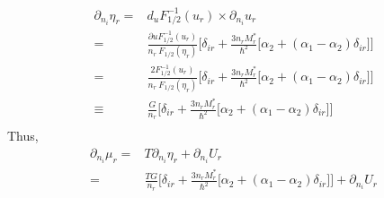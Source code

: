 \documentclass[preprint,prc,preprintnumbers,superscriptaddress,amsmath,amssymb,floatfix]{revtex4-1}
\begin{document}
\begin{equation}
 \begin{split}
  \partial_{n_i}\eta_r=&d_{u}F^{-1}_{1/2}(u_r) \times \partial_{n_i}u_r\\
  =&\frac{\partial{u}F^{-1}_{1/2}(u_r)}{n_r \ F_{1/2}(\eta_r)} \Big[\delta_{ir}+\frac{3 n_r M_r^{*}}{\hbar^2}\big[\alpha_2+(\alpha_1-\alpha_2)\delta_{ir}\big]\Big]\\
  =&\frac{2F^{-1}_{1/2}(u_r)}{n_r \ F_{1/2}(\eta_r)} \Big[\delta_{ir}+\frac{3 n_r M_r^{*}}{\hbar^2}\big[\alpha_2+(\alpha_1-\alpha_2)\delta_{ir}\big]\Big]\\
  \equiv& \frac{G}{n_r}\Big[\delta_{ir}+\frac{3 n_r M_r^{*}}{\hbar^2}\big[\alpha_2+(\alpha_1-\alpha_2)\delta_{ir}\big]\Big]\\
 \end{split}
\end{equation}
Thus,
\begin{equation}
 \begin{split}
  \partial_{n_i}\mu_r =& T\partial_{n_i}\eta_r + \partial_{n_i} U_r\\
  =&\frac{TG}{n_r}\Big[\delta_{ir}+\frac{3 n_r M_r^{*}}{\hbar^2}\big[\alpha_2+(\alpha_1-\alpha_2)\delta_{ir}\big]\Big] + \partial_{n_i} U_r
 \end{split}
\end{equation}
\end{document}
